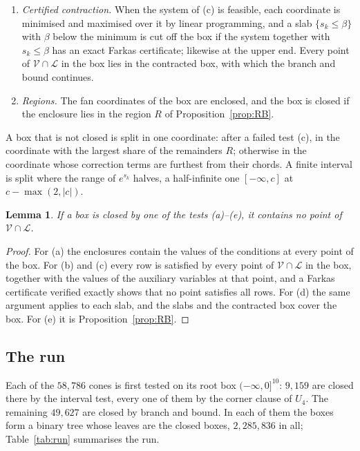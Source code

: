 \documentclass[11pt,a4paper]{article}
\newtheorem{lemma}[theorem]{Lemma}
\theoremstyle{definition}
\theoremstyle{remark}
\newcommand{\V}{\mathcal{V}}
\newcommand{\Lam}{\mathcal{L}}
\begin{document}
\begin{enumerate}[label=(\alph*),leftmargin=2em]
\item \emph{Certified contraction.} When the system of (c) is feasible, each coordinate is minimised and
maximised over it by linear programming, and a slab $\{s_k \le \beta\}$ with $\beta$ below the minimum is
cut off the box if the system together with $s_k \le \beta$ has an exact Farkas certificate; likewise at the
upper end. Every point of $\V \cap \Lam$ in the box lies in the contracted box, with which the branch and
bound continues.

\item \emph{Regions.} The fan coordinates of the box are enclosed, and the box is closed if the enclosure
lies in the region $R$ of Proposition~\ref{prop:RB}.
\end{enumerate}

A box that is not closed is split in one coordinate: after a failed test (c), in the coordinate with the
largest share of the remainders $R$; otherwise in the coordinate whose correction terms are furthest from
their chords. A finite interval is split where the range of $e^{s_k}$ halves, a half-infinite one
$[-\infty, c]$ at $c - \max(2, |c|)$.

\begin{lemma}\label{lem:sound}
If a box is closed by one of the tests (a)--(e), it contains no point of $\V \cap \Lam$.
\end{lemma}

\begin{proof}
For (a) the enclosures contain the values of the conditions at every point of the box. For (b) and (c)
every row is satisfied by every point of $\V \cap \Lam$ in the box, together with the values of the
auxiliary variables at that point, and a Farkas certificate verified exactly shows that no point satisfies
all rows. For (d) the same argument applies to each slab, and the slabs and the contracted box cover the
box. For (e) it is Proposition~\ref{prop:RB}.
\end{proof}

\subsection{The run}
Each of the $58{,}786$ cones is first tested on its root box $(-\infty, 0]^{10}$: $9{,}159$ are closed
there by the interval test, every one of them by the corner clause of $U_4$. The remaining $49{,}627$ are
closed by branch and bound. In each of them the boxes form a binary tree whose leaves are the closed boxes,
$2{,}285{,}836$ in all; Table~\ref{tab:run} summarises the run.
\end{document}
